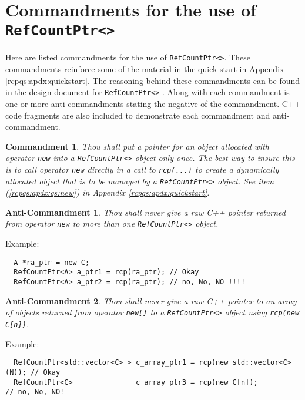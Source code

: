 \documentclass[pdf,ps2pdf,11pt]{SANDreport}
\newtheorem{commandment}{Commandment}
\newtheorem{anticommandment}{Anti-Commandment}
\begin{document}
%
\section{Commandments for the use of {}\texttt{Ref\-Count\-Ptr<>}}
\label{rcpqs:apdx:commandments}
%

Here are listed commandments for the use of
{}\texttt{Ref\-Count\-Ptr<>}.  These commandments reinforce some of
the material in the quick-start in Appendix
{}\ref{rcpqs:apdx:quickstart}.  The reasoning behind these
commandments can be found in the design document for
{}\texttt{Ref\-Count\-Ptr<>} {}\cite{ref:RefCountPtr}.  Along with
each commandment is one or more anti-commandments stating the negative
of the commandment.  C++ code fragments are also included to
demonstrate each commandment and anti-commandment.

\begin{commandment}\label{rcp:cmd:rcp-new}
Thou shall put a pointer for an object allocated with operator
{}\texttt{new} into a {}\texttt{Ref\-Count\-Ptr<>} object only once.
The best way to insure this is to call operator {}\texttt{new}
directly in a call to {}\texttt{rcp(...)} to create a dynamically
allocated object that is to be managed by a
{}\texttt{Ref\-Count\-Ptr<>} object.  See item
({}\ref{rcpqs:apdx:qs:new}) in Appendix
{}\ref{rcpqs:apdx:quickstart}.
\end{commandment}

\begin{anticommandment}
Thou shall never give a raw C++ pointer returned from operator
{}\texttt{new} to more than one {}\texttt{Ref\-Count\-Ptr<>} object.
\end{anticommandment}

{}\noindent{}Example:
{\small\begin{verbatim}
  A *ra_ptr = new C;
  RefCountPtr<A> a_ptr1 = rcp(ra_ptr); // Okay
  RefCountPtr<A> a_ptr2 = rcp(ra_ptr); // no, No, NO !!!!
\end{verbatim}}

\begin{anticommandment}
Thou shall never give a raw C++ pointer to an array of objects
returned from operator {}\texttt{new[]} to a
{}\texttt{Ref\-Count\-Ptr<>} object using {}\texttt{rcp(new C[n])}.
\end{anticommandment}

{}\noindent{}Example:
{\small\begin{verbatim}
  RefCountPtr<std::vector<C> > c_array_ptr1 = rcp(new std::vector<C>(N)); // Okay
  RefCountPtr<C>               c_array_ptr3 = rcp(new C[n]);              // no, No, NO!
\end{verbatim}}
\end{document}
